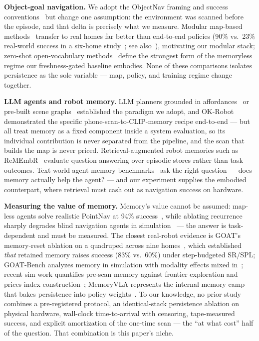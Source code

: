 \documentclass{article}
\begin{document}
\textbf{Object-goal navigation.} We adopt the ObjectNav framing and
success conventions~\cite{Batra2020} but change one assumption: the
environment was scanned before the episode, and that delta is precisely
what we measure. Modular map-based methods~\cite{Chaplot2020} transfer
to real homes far better than end-to-end policies (90\% vs.\ 23\%
real-world success in a six-home study~\cite{Gervet2023}; see
also~\cite{Ramrakhya2023}), motivating our modular stack; zero-shot
open-vocabulary methods~\cite{Gadre2023,Yokoyama2024} define the
strongest form of the memoryless regime our freshness-gated baseline
embodies. None of these comparisons isolates persistence as the sole
variable --- map, policy, and training regime change together.

\textbf{LLM agents and robot memory.} LLM planners grounded in
affordances~\cite{Ahn2022} or pre-built scene graphs~\cite{Rana2023}
established the paradigm we adopt, and OK-Robot~\cite{Liu2024}
demonstrated the specific phone-scan-to-CLIP-memory recipe end-to-end
--- but all treat memory as a fixed component inside a system
evaluation, so its individual contribution is never separated from the
pipeline, and the scan that builds the map is never priced.
Retrieval-augmented robot memories such as ReMEmbR~\cite{Anwar2024}
evaluate question answering over episodic stores rather than task
outcomes. Text-world agent-memory benchmarks~\cite{Maharana2024,Hu2025}
ask the right question --- does memory actually help the agent? --- and
our experiment supplies the embodied counterpart, where retrieval must
cash out as navigation success on hardware.

\textbf{Measuring the value of memory.} Memory's value cannot be
assumed: map-less agents solve realistic PointNav at 94\%
success~\cite{Partsey2022}, while ablating recurrence sharply degrades
blind navigation agents in simulation~\cite{Wijmans2023} --- the answer
is task-dependent and must be measured. The closest real-robot evidence
is GOAT's memory-reset ablation on a quadruped across nine
homes~\cite{Chang2023}, which established \emph{that} retained memory
raises success (83\% vs.\ 60\%) under step-budgeted SR/SPL; GOAT-Bench
analyzes memory in simulation with modality effects mixed
in~\cite{Khanna2024}; recent sim work quantifies pre-scan memory
against frontier exploration and prices index
construction~\cite{MemoryOverMaps2026}; MemoryVLA represents the
internal-memory camp that bakes persistence into policy
weights~\cite{Shi2025}. To our knowledge, no prior study combines a
pre-registered protocol, an identical-stack persistence ablation on
physical hardware, wall-clock time-to-arrival with censoring,
tape-measured success, and explicit amortization of the one-time scan
--- the ``at what cost'' half of the question. That combination is this
paper's niche.
\end{document}
